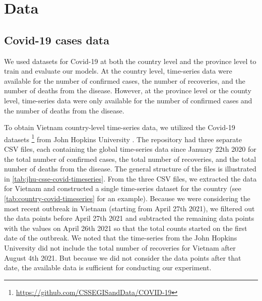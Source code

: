 \section{Data}
\label{sec:methodologies-data}

\subsection{Covid-19 cases data}
\label{sec:methodologies-data-covid19-cases}

We used datasets for Covid-19 at both the country level and the province level to train and evaluate our models.
At the country level, time-series data were available for the number of confirmed cases, the number of recoveries, and the number of deaths from the disease.
However, at the province level or the county level, time-series data were only available for the number of confirmed cases and the number of deaths from the disease.

To obtain Vietnam country-level time-series data, we utilized the Covid-19 datasets \footnote{\url{https://github.com/CSSEGISandData/COVID-19}} from John Hopkins University \cite{dongInteractiveWebbasedDashboard2020}.
The repository had three separate \gls{CSV} files, each containing the global time-series data since January 22th 2020 for the total number of confirmed cases, the total number of recoveries, and the total number of deaths from the disease.
The general structure of the files is illustrated in \autoref{tab:jhu-csse-covid-timeseries}.
From the three \gls{CSV} files, we extracted the data for Vietnam and constructed a single time-series dataset for the country (see \autoref{tab:country-covid-timeseries} for an example).
Because we were considering the most recent outbreak in Vietnam (starting from April 27th 2021), we filtered out the data points before April 27th 2021 and subtracted the remaining data points with the values on April 26th 2021 so that the total counts started on the first date of the outbreak.
We noted that the time-series from the John Hopkins University did not include the total number of recoveries for Vietnam after August 4th 2021.
But because we did not consider the data points after that date, the available data is sufficient for conducting our experiment.

